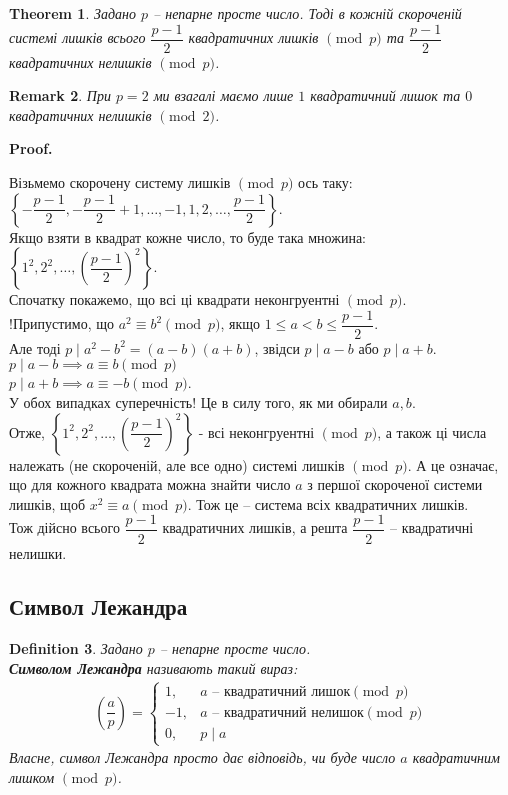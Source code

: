 \documentclass[a4paper, 14pt]{extarticle}
\makeatletter
\theoremstyle{theoremdd}
\newtheorem{theorem}{Theorem}[subsection]
\theoremstyle{theoremdd}
\newtheorem{definition}[theorem]{Definition}
\theoremstyle{theoremdd}
\theoremstyle{theoremdd}
\theoremstyle{theoremdd}
\theoremstyle{theoremdd}
\newtheorem{remark}[theorem]{Remark}
\theoremstyle{theoremdd}
\theoremstyle{theoremdd}
\def\qed{$\blacksquare$}
\renewenvironment{proof}[1][Proof.\\]{\par
\pushQED{\hfill \qed}%
\normalfont \topsep6\p@\@plus6\p@\relax
\trivlist
\item\relax
{\bfseries
#1\@addpunct{.}}\hspace\labelsep\ignorespaces
}{%
\popQED\endtrivlist\@endpefalse
}
\makeatother
\begin{document}
\begin{theorem}
Задано $p$ -- непарне просте число. Тоді в кожній скороченій системі лишків всього $\dfrac{p-1}{2}$ квадратичних лишків $\pmod p$ та $\dfrac{p-1}{2}$ квадратичних нелишків $\pmod p$.
\end{theorem}

\begin{remark}
При $p =2$ ми взагалі маємо лише $1$ квадратичний лишок та $0$ квадратичних нелишків $\pmod 2$.
\end{remark}

\begin{proof}
Візьмемо скорочену систему лишків $\pmod p$ ось таку: \\ $\left\{ -\dfrac{p-1}{2}, -\dfrac{p-1}{2}+1,\dots, -1,1,2,\dots,\dfrac{p-1}{2} \right\}$.\\
Якщо взяти в квадрат кожне число, то буде така множина:\\
$\left\{1^2,2^2,\dots, \left( \dfrac{p-1}{2} \right)^2 \right\}$.\\
Спочатку покажемо, що всі ці квадрати неконгруентні $\pmod p$.\\
!Припустимо, що $a^2 \equiv b^2 \pmod p$, якщо $1 \leq a < b \leq \dfrac{p-1}{2}$.\\
Але тоді $p \mid a^2-b^2 = (a-b)(a+b)$, звідси $p \mid a-b$ або $p \mid a+b$.\\
$p \mid a-b \implies a \equiv b \pmod p$\\
$p \mid a+b \implies a \equiv -b \pmod p$.\\
У обох випадках суперечність! Це в силу того, як ми обирали $a,b$.\\
Отже, $\left\{1^2,2^2,\dots, \left( \dfrac{p-1}{2} \right)^2 \right\}$ - всі неконгруентні $\pmod p$, а також ці числа належать (не скороченій, але все одно) системі лишків $\pmod p$. А це означає, що для кожного квадрата можна знайти число $a$ з першої скороченої системи лишків, щоб $x^2 \equiv a \pmod p$. Тож це -- система всіх квадратичних лишків.\\
Тож дійсно всього $\dfrac{p-1}{2}$ квадратичних лишків, а решта $\dfrac{p-1}{2}$ -- квадратичні нелишки.
\end{proof}

\subsection{Символ Лежандра}
\begin{definition}
Задано $p$ -- непарне просте число.\\
\textbf{Символом Лежандра} називають такий вираз:
\begin{align*}
\left( \dfrac{a}{p} \right) = \begin{cases} 1, & a \text{ -- квадратичний лишок} \pmod p \\ -1 , & a \text{ -- квадратичний нелишок} \pmod p \\ 0, & p \mid a \end{cases}
\end{align*}
Власне, символ Лежандра просто дає відповідь, чи буде число $a$ квадратичним лишком $\pmod p$.
\end{definition}
\end{document}
